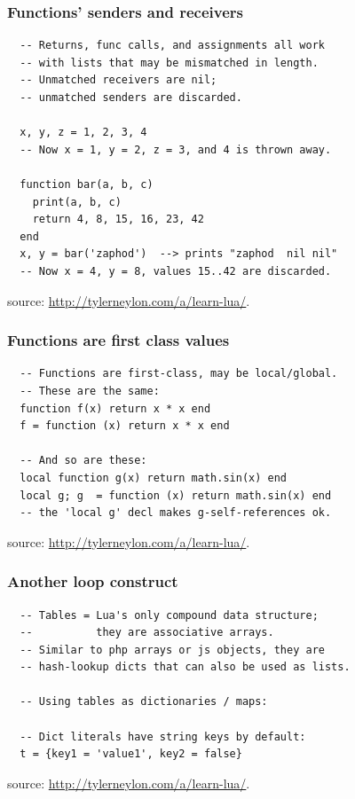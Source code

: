 \begin{frame}[fragile]
  \frametitle{Functions' senders and receivers}
  \begin{verbatim}
  -- Returns, func calls, and assignments all work
  -- with lists that may be mismatched in length.
  -- Unmatched receivers are nil;
  -- unmatched senders are discarded.

  x, y, z = 1, 2, 3, 4
  -- Now x = 1, y = 2, z = 3, and 4 is thrown away.

  function bar(a, b, c)
    print(a, b, c)
    return 4, 8, 15, 16, 23, 42
  end
  x, y = bar('zaphod')  --> prints "zaphod  nil nil"
  -- Now x = 4, y = 8, values 15..42 are discarded.
  \end{verbatim}
  \vfill
  \begin{center}
    \begin{tiny}
      source: \url{http://tylerneylon.com/a/learn-lua/}.
    \end{tiny}
  \end{center}
\end{frame}


\begin{frame}[fragile]
  \frametitle{Functions are first class values}
  \begin{verbatim}
  -- Functions are first-class, may be local/global.
  -- These are the same:
  function f(x) return x * x end
  f = function (x) return x * x end

  -- And so are these:
  local function g(x) return math.sin(x) end
  local g; g  = function (x) return math.sin(x) end
  -- the 'local g' decl makes g-self-references ok.
  \end{verbatim}
  \vfill
  \begin{center}
    \begin{tiny}
      source: \url{http://tylerneylon.com/a/learn-lua/}.
    \end{tiny}
  \end{center}
\end{frame}


\begin{frame}[fragile]
  \frametitle{Another loop construct}
  \begin{verbatim}
  -- Tables = Lua's only compound data structure;
  --          they are associative arrays.
  -- Similar to php arrays or js objects, they are
  -- hash-lookup dicts that can also be used as lists.

  -- Using tables as dictionaries / maps:

  -- Dict literals have string keys by default:
  t = {key1 = 'value1', key2 = false}
  \end{verbatim}
  \vfill
  \begin{center}
    \begin{tiny}
      source: \url{http://tylerneylon.com/a/learn-lua/}.
    \end{tiny}
  \end{center}
\end{frame}


